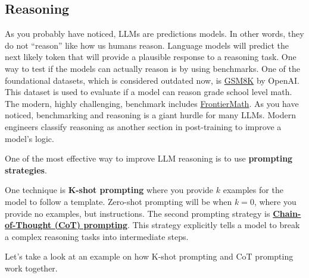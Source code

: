 \documentclass[../../../main.tex]{subfiles}
\begin{document}
\subsection{Reasoning}

As you probably have noticed, LLMs are predictions models.
In other words, they do not ``reason'' like how us humans
reason. Language models will predict the next likely token
that will provide a plausible response to a reasoning task.
One way to test if the models can actually reason is by
using benchmarks. One of the foundational datasets, which
is considered outdated now, is
\href{https://huggingface.co/datasets/openai/gsm8k}{GSM8K}
by OpenAI. This dataset is used to evaluate if a model can
reason grade school level math. The modern, highly challenging,
benchmark includes \href{https://epoch.ai/frontiermath}{FrontierMath}.
As you have noticed, benchmarking and reasoning is a giant
hurdle for many LLMs. Modern engineers classify reasoning
as another section in post-training to improve a model's logic.

One of the most effective way to improve LLM reasoning is
to use \textbf{prompting strategies}.

\begin{definition}{}{}
One technique is \textbf{K-shot prompting} where you provide
$k$ examples for the model to follow a template. Zero-shot
prompting will be when $k = 0$, where you provide no examples,
but instructions. The second prompting strategy is \textbf{
\href{https://arxiv.org/abs/2201.11903}{Chain-of-Thought (CoT)
prompting}}. This strategy explicitly tells a model to break
a complex reasoning tasks into intermediate steps. 
\end{definition}

Let's take a look at an example on how K-shot prompting and
CoT prompting work together.
\end{document}
